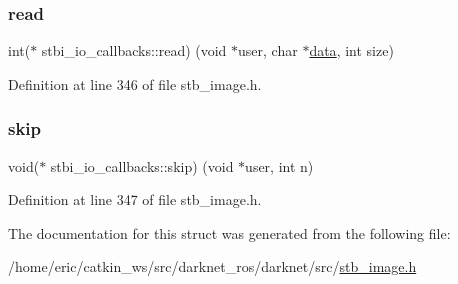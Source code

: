 \mbox{\label{structstbi__io__callbacks_a623e46b3a2a019611601409926283a88}} 
\subsubsection{\texorpdfstring{read}{read}}
{\footnotesize\ttfamily int($\ast$ stbi\+\_\+io\+\_\+callbacks\+::read) (void $\ast$user, char $\ast$\mbox{\hyperlink{structdata}{data}}, int size)}



Definition at line 346 of file stb\+\_\+image.\+h.

\mbox{\label{structstbi__io__callbacks_a257aac5480a90a6c4b8fbe86c1b01068}} 
\subsubsection{\texorpdfstring{skip}{skip}}
{\footnotesize\ttfamily void($\ast$ stbi\+\_\+io\+\_\+callbacks\+::skip) (void $\ast$user, int n)}



Definition at line 347 of file stb\+\_\+image.\+h.



The documentation for this struct was generated from the following file\+:\begin{DoxyCompactItemize}
\item 
/home/eric/catkin\+\_\+ws/src/darknet\+\_\+ros/darknet/src/\mbox{\hyperlink{stb__image_8h}{stb\+\_\+image.\+h}}\end{DoxyCompactItemize}

